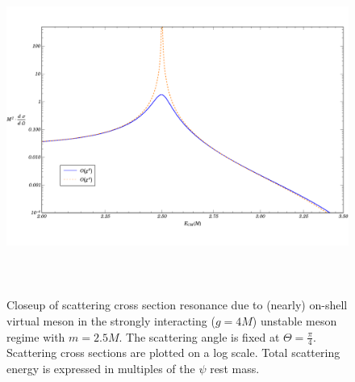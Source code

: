 \documentclass[12pt]{extarticle}
\begin{document}
\begin{figure}
\begin{center}
\includegraphics[width=15cm, height=11cm]{Resonance-Illustration}
\caption{Closeup of scattering cross section resonance due to (nearly) on-shell virtual meson in the strongly interacting ($g = 4 M$) unstable meson regime with $m = 2.5 M$. The scattering angle is fixed at $\Theta = \frac{\pi}{4}$. Scattering cross sections are plotted on a log scale. Total scattering energy is expressed in multiples of the $\psi$ rest mass.} 
\label{IllResonance}
\end{center}
\end{figure}
\end{document}
